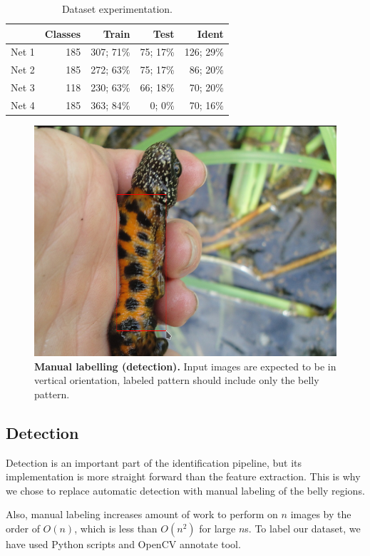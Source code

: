 \documentclass[fleqn,moreauthors,10pt]{ds_report}
\begin{document}
\begin{table}[hbt]
	\caption{Dataset experimentation.}
	\centering
	\begin{tabular}{l r r r r}
		\toprule
		          & Classes & Train       & Test       & Ident      \\
		\midrule
		Net 1     & 185     & 307; 71\%   & 75; 17\%   & 126; 29\% \\
		Net 2     & 185     & 272; 63\%   & 75; 17\%   & 86; 20\% \\
		Net 3     & 118     & 230; 63\%   & 66; 18\%   & 70; 20\% \\
		Net 4     & 185     & 363; 84\%   & 0; 0\%     & 70; 16\% \\
		\bottomrule
	\end{tabular}
	\label{tab:dataset-experimentation}
\end{table}

\begin{figure}[!hb]\centering
	\includegraphics[width=0.8\linewidth]{labelling.png}
	\caption{\textbf{Manual labelling (detection).} Input images are expected to be in vertical orientation, labeled pattern should include only the belly pattern.}
	\label{fig:manual-labelling}
\end{figure}

\subsection*{Detection}

Detection is an important part of the identification pipeline, but its implementation is more straight forward than the feature extraction. This is why we chose to replace automatic detection with manual labeling of the belly regions.

Also, manual labeling increases amount of work to perform on $n$ images by the order of $O(n)$, which is less than $O(n^2)$ for large $n$s. To label our dataset, we have used Python scripts and OpenCV annotate tool.
\end{document}
